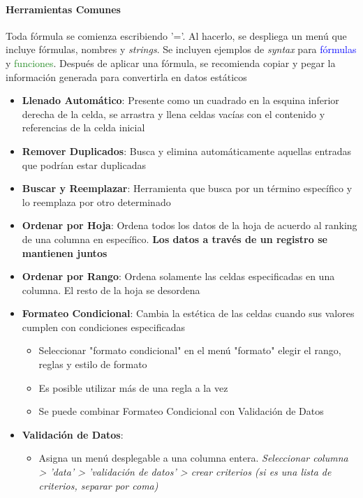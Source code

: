 \paragraph{Herramientas Comunes}
Toda fórmula se comienza escribiendo '='. Al hacerlo, se despliega un menú que incluye fórmulas, nombres y \textit{strings}. Se incluyen ejemplos de \textit{syntax} para \textcolor{blue}{fórmulas} y \textcolor{ForestGreen}{funciones}. Después de aplicar una fórmula, se recomienda copiar y pegar la información generada para convertirla en datos estáticos
\begin{itemize}
    \item {\textbf{Llenado Automático}: Presente como un cuadrado en la esquina inferior derecha de la celda, se arrastra y llena celdas vacías con el contenido y referencias de la celda inicial}
    \item {\textbf{Remover Duplicados}: Busca y elimina automáticamente aquellas entradas que podrían estar duplicadas} 
    \item {\textbf{Buscar y Reemplazar}: Herramienta que busca por un término específico y lo reemplaza por otro determinado}
    \item {\textbf{Ordenar por Hoja}: Ordena todos los datos de la hoja de acuerdo al ranking de una columna en específico. \textbf{Los datos a través de un registro se mantienen juntos}}
    \item {\textbf{Ordenar por Rango}: Ordena solamente las celdas especificadas en una columna. El resto de la hoja se desordena}
    \item {\textbf{Formateo Condicional}: Cambia la estética de las celdas cuando sus valores cumplen con condiciones especificadas
        \begin{itemize}
            \item {Seleccionar "formato condicional" en el menú "formato"  elegir el rango, reglas y estilo de formato}
            \item {Es posible utilizar más de una regla a la vez}
            \item {Se puede combinar Formateo Condicional con Validación de Datos}
        \end{itemize}}
    \item {\textbf{Validación de Datos}: 
    \begin{itemize}
        \item {Asigna un menú desplegable a una columna entera. \textit{Seleccionar columna > 'data' > 'validación de datos' > crear criterios (si es una lista de criterios, separar por coma)}}

\end{itemize}}
\end{itemize}
